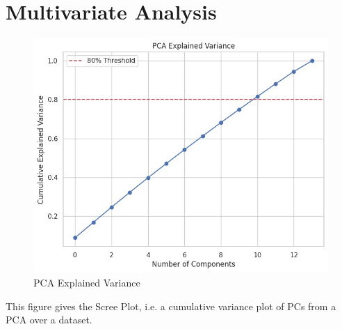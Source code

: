 \section{Multivariate Analysis}
\begin{figure}[H]
    \centering
    \includegraphics[width=1\linewidth]{Chap3/pca_explained_variance.jpeg}
    \caption{PCA Explained Variance}
    \label{fig:placeholder}
\end{figure}

This figure gives the Scree Plot, i.e. a cumulative variance plot of PCs from a PCA over a dataset.

